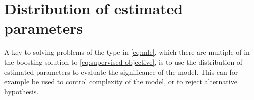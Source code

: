 \section{Distribution of estimated parameters}
\label{sec:distribution of estimated parameters}


A key to solving problems of the type in \eqref{eq:mle}, which there are multiple of in the boosting solution to \eqref{eq:supervised objective}, is to use the distribution of estimated parameters to evaluate the significance of the model.
This can for example be used to control complexity of the model, or to reject alternative hypothesis.

